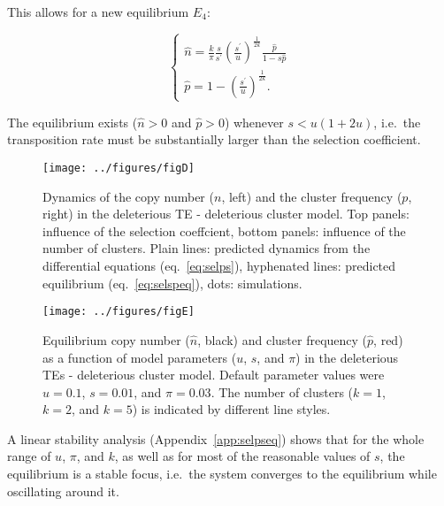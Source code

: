 \documentclass[10pt,a4paper]{article}
\begin{document}
This allows for a new equilibrium $E_4$:

\begin{equation}\label{eq:selpseq}
\begin{cases}
\displaystyle \hat n = \frac{k}{\pi}\frac{s}{s^\prime} \left(\frac{s^\prime}{u}\right)^\frac{1}{2k}\frac{\hat p}{1-s\hat p} \\
\displaystyle \hat p = 1 - \left(\frac{s^\prime}{u}\right)^\frac{1}{2k}.
\end{cases}
\end{equation}

The equilibrium exists ($\hat n > 0$ and $\hat p > 0$) whenever $s < u(1+2u)$, i.e.\ the transposition rate must be substantially larger than the selection coefficient. 

\begin{figure}
\begin{adjustwidth}{-2in}{0in}
\begin{center}
	\texttt{[image: ../figures/figD]}
\caption{\label{fig:figD} Dynamics of the copy number ($n$, left) and the cluster frequency ($p$, right) in the deleterious TE - deleterious cluster model. Top panels: influence of the selection coeffcient, bottom panels: influence of the number of clusters. Plain lines: predicted dynamics from the differential equations (eq.~\ref{eq:selps}), hyphenated lines: predicted equilibrium (eq.~\ref{eq:selspeq}), dots: simulations. }
\end{center}\end{adjustwidth}
\end{figure}


\begin{figure}
\begin{adjustwidth}{-1in}{0in}
\begin{center}
	\texttt{[image: ../figures/figE]}
\caption{\label{fig:figE} Equilibrium copy number ($\hat n$, black) and cluster frequency ($\hat p$, red) as a function of model parameters ($u$, $s$, and $\pi$) in the deleterious TEs - deleterious cluster model. Default parameter values were $u=0.1$, $s=0.01$, and $\pi=0.03$. The number of clusters ($k=1$, $k=2$, and $k=5$) is indicated by different line styles. }
\end{center}\end{adjustwidth}
\end{figure}

A linear stability analysis (Appendix~\ref{app:selpseq}) shows that for the whole range of $u$, $\pi$, and $k$, as well as for most of the reasonable values of $s$, the equilibrium is a stable focus, i.e.\ the system converges to the equilibrium while oscillating around it. 
\end{document}
